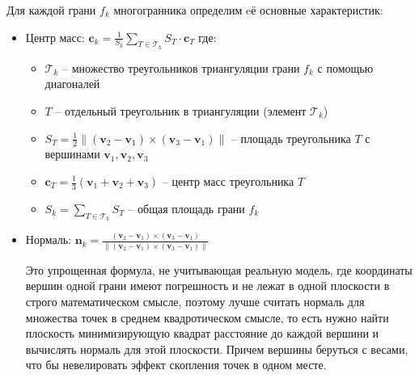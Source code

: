 \documentclass[a4paper,14pt]{extarticle}
\begin{document}
Для каждой грани $f_k$ многогранника определим eё основные характеристик:
\begin{itemize}
    \item Центр масс: $\mathbf{c}_k = \frac{1}{S_k} \sum\limits_{T \in \mathcal{T}_k} S_T \cdot \mathbf{c}_T$
    \noindent где:
    \begin{itemize}
        \item $\mathcal{T}_k$ -- множество треугольников триангуляции грани $f_k$ с помощью диагоналей
        \item $T$ -- отдельный треугольник в триангуляции (элемент $\mathcal{T}_k$)
        \item $S_T = \frac{1}{2}\|(\mathbf{v}_2 - \mathbf{v}_1) \times (\mathbf{v}_3 - \mathbf{v}_1)\|$ -- площадь треугольника $T$ 
            с вершинами $\mathbf{v}_1, \mathbf{v}_2, \mathbf{v}_3$
        \item $\mathbf{c}_T = \frac{1}{3}(\mathbf{v}_1 + \mathbf{v}_2 + \mathbf{v}_3)$ -- центр масс треугольника $T$
        \item $S_k = \sum_{T \in \mathcal{T}_k} S_T$ -- общая площадь грани $f_k$
    \end{itemize}
    \item Нормаль: $\mathbf{n}_k = \frac{(\mathbf{v}_2 - \mathbf{v}_1) \times (\mathbf{v}_3 - \mathbf{v}_1)}{\|(\mathbf{v}_2 - \mathbf{v}_1) \times (\mathbf{v}_3 - \mathbf{v}_1)\|}$

Это упрощенная формула, не учитывающая реальную модель, где координаты вершин одной грани имеют погрешность и не лежат
в одной плоскости в строго математическом смысле, поэтому лучше считать нормаль для множества точек в среднем квадротическом смысле,
то есть нужно найти плоскость минимизирующую квадрат расстояние до каждой вершини и вычислять нормаль для этой плоскости.
Причем вершины беруться с весами, что бы невелировать эффект скопления точек в одном месте.
\end{itemize}
\end{document}
